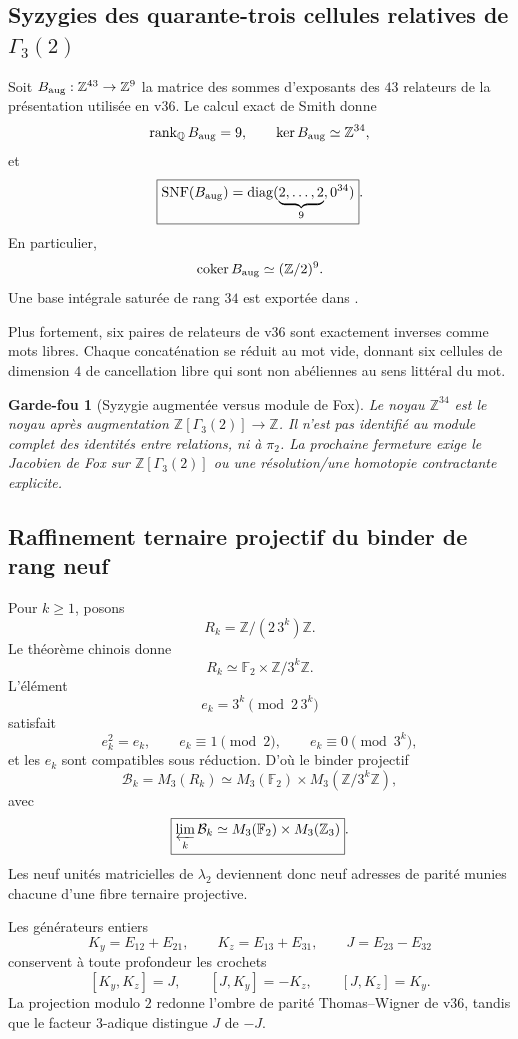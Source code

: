 \documentclass[11pt,a4paper]{article}
\newtheorem{guardrail}[theorem]{Garde-fou}
\newcommand{\Z}{\mathbb Z}
\newcommand{\rank}{\operatorname{rank}}
\begin{document}
\subsection{Syzygies des quarante-trois cellules relatives de \texorpdfstring{$\Gamma_3(2)$}{Gamma3(2)}}

Soit $B_{\rm aug}:\Z^{43}\to\Z^9$ la matrice des sommes d'exposants des $43$ relateurs de la présentation utilisée en v36. Le calcul exact de Smith donne
\[
 \rank_{\mathbb Q}B_{\rm aug}=9,
 \qquad
 \ker B_{\rm aug}\simeq\Z^{34},
\]
et
\[
 \boxed{\operatorname{SNF}(B_{\rm aug})
 =\operatorname{diag}(\underbrace{2,\ldots,2}_{9},0^{34})}.
\]
En particulier,
\[
 \operatorname{coker}B_{\rm aug}\simeq(\Z/2)^9.
\]
Une base intégrale saturée de rang $34$ est exportée dans .

Plus fortement, six paires de relateurs de v36 sont exactement inverses comme mots libres. Chaque concaténation se réduit au mot vide, donnant six cellules de dimension $4$ de cancellation libre qui sont non abéliennes au sens littéral du mot.

\begin{guardrail}[Syzygie augmentée versus module de Fox]
Le noyau $\Z^{34}$ est le noyau après augmentation $\Z[\Gamma_3(2)]\to\Z$. Il n'est pas identifié au module complet des identités entre relations, ni à $\pi_2$. La prochaine fermeture exige le Jacobien de Fox sur $\Z[\Gamma_3(2)]$ ou une résolution/une homotopie contractante explicite.
\end{guardrail}

\subsection{Raffinement ternaire projectif du binder de rang neuf}

Pour $k\ge1$, posons
\[
 R_k=\Z/(2\,3^k)\Z.
\]
Le théorème chinois donne
\[
 R_k\simeq\mathbb F_2\times\Z/3^k\Z.
\]
L'élément
\[
 e_k=3^k\pmod{2\,3^k}
\]
satisfait
\[
 e_k^2=e_k,\qquad e_k\equiv1\pmod2,\qquad
 e_k\equiv0\pmod{3^k},
\]
et les $e_k$ sont compatibles sous réduction. D'où le binder projectif
\[
 \mathcal B_k=M_3(R_k)
 \simeq M_3(\mathbb F_2)\times M_3(\Z/3^k\Z),
\]
avec
\[
 \boxed{\varprojlim_k\mathcal B_k
 \simeq M_3(\mathbb F_2)\times M_3(\mathbb Z_3)}.
\]
Les neuf unités matricielles de $\lambda_2$ deviennent donc neuf adresses de parité munies chacune d'une fibre ternaire projective.

Les générateurs entiers
\[
 K_y=E_{12}+E_{21},\qquad
 K_z=E_{13}+E_{31},\qquad
 J=E_{23}-E_{32}
\]
conservent à toute profondeur les crochets
\[
 [K_y,K_z]=J,\qquad [J,K_y]=-K_z,\qquad [J,K_z]=K_y.
\]
La projection modulo $2$ redonne l'ombre de parité Thomas--Wigner de v36, tandis que le facteur $3$-adique distingue $J$ de $-J$.
\end{document}
